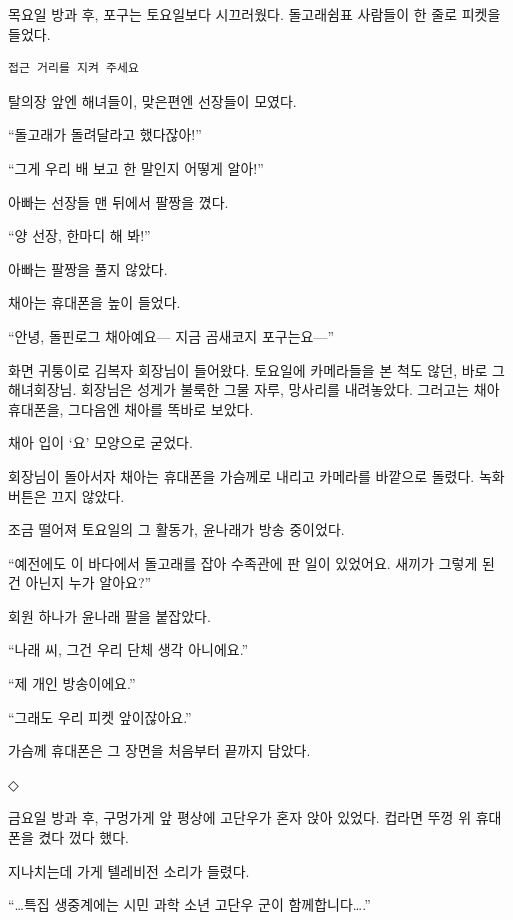 \documentclass[
  korean,
  letterpaper,
  twoside,
  open=any,
  fontsize=12.5pt,
  headings=small]{scrbook}
\newcommand{\logfont}{\linespread{1}\fontsize{10.8}{15.2}\selectfont}
\begin{document}
목요일 방과 후, 포구는
토요일보다 시끄러웠다.
돌고래쉼표 사람들이 한 줄로
피켓을 들었다.

\begin{Verbatim}[samepage=true,frame=single,framesep=2.5mm,rulecolor=\color{gray},formatcom=\logfont]
접근 거리를 지켜 주세요
\end{Verbatim}

탈의장 앞엔 해녀들이, 맞은편엔
선장들이 모였다.

``돌고래가 돌려달라고
했다잖아!''

``그게 우리 배 보고 한 말인지
어떻게 알아!''

아빠는 선장들 맨 뒤에서 팔짱을
꼈다.

``양 선장, 한마디 해 봐!''

아빠는 팔짱을 풀지 않았다.

채아는 휴대폰을 높이 들었다.

``안녕, 돌핀로그 채아예요---
지금 곰새코지 포구는요---''

화면 귀퉁이로 김복자 회장님이
들어왔다. 토요일에 카메라들을
본 척도 않던, 바로 그
해녀회장님. 회장님은 성게가
불룩한 그물 자루, 망사리를
내려놓았다. 그러고는 채아
휴대폰을, 그다음엔 채아를
똑바로 보았다.

채아 입이 `요' 모양으로
굳었다.

회장님이 돌아서자 채아는
휴대폰을 가슴께로 내리고
카메라를 바깥으로 돌렸다. 녹화
버튼은 끄지 않았다.

조금 떨어져 토요일의 그
활동가, 윤나래가 방송
중이었다.

``예전에도 이 바다에서
돌고래를 잡아 수족관에 판 일이
있었어요. 새끼가 그렇게 된 건
아닌지 누가 알아요?''

회원 하나가 윤나래 팔을
붙잡았다.

``나래 씨, 그건 우리 단체 생각
아니에요.''

``제 개인 방송이에요.''

``그래도 우리 피켓
앞이잖아요.''

가슴께 휴대폰은 그 장면을
처음부터 끝까지 담았다.

\begin{center}◇\end{center}\nopagebreak

금요일 방과 후, 구멍가게 앞
평상에 고단우가 혼자 앉아
있었다. 컵라면 뚜껑 위
휴대폰을 켰다 껐다 했다.

지나치는데 가게 텔레비전
소리가 들렸다.

``\ldots 특집 생중계에는 시민
과학 소년 고단우 군이
함께합니다\ldots.''
\end{document}
